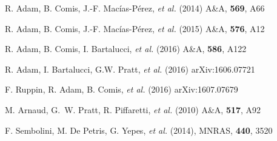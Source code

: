 \documentclass[11pt,a4paper,twoside,graphicx,color]{article}
\begin{document}
\begin{thebibliography}{9}
   {\small R. Adam, B. Comis, J.-F. Mac\'ias-P\'erez, {\it et al.} (2014) A\&A, \textbf{569}, A66}

   {\small R. Adam, B. Comis, J.-F. Mac\'ias-P\'erez, {\it et al.} (2015) A\&A, \textbf{576}, A12}

   {\small R. Adam, B. Comis, I. Bartalucci, {\it et al.} (2016) A\&A, \textbf{586}, A122}

   {\small R. Adam, I. Bartalucci, G.W. Pratt, {\it et al.} (2016) arXiv:1606.07721}

  {\small F. Ruppin, R. Adam, B. Comis, {\it et al.} (2016) arXiv:1607.07679}

   {\small M. Arnaud, G.~W. Pratt, R. Piffaretti, {\it et al.} (2010) A\&A, \textbf{517}, A92}

   {\small F. Sembolini, M. De Petris, G. Yepes, {\it et al.} (2014), MNRAS, \textbf{440}, 3520}
  
\end{thebibliography}
\end{document}
